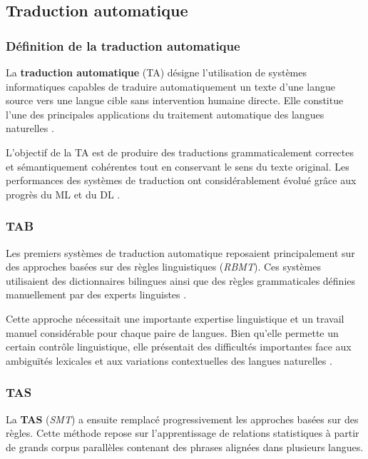 \subsection{Traduction automatique}

\subsubsection{Définition de la traduction automatique}

La \textbf{traduction automatique} (\ac{TA}) désigne l'utilisation de systèmes informatiques capables de traduire automatiquement un texte d'une langue source vers une langue cible sans intervention humaine directe. Elle constitue l'une des principales applications du traitement automatique des langues naturelles \cite{ranathunga2023neural}.

L'objectif de la \ac{TA} est de produire des traductions grammaticalement correctes et sémantiquement cohérentes tout en conservant le sens du texte original. Les performances des systèmes de traduction ont considérablement évolué grâce aux progrès du \ac{ML} et du \ac{DL} \cite{vaswani2017attention}.

\subsubsection{\ac{TAB}}

Les premiers systèmes de traduction automatique reposaient principalement sur des approches basées sur des règles linguistiques (\textit{\ac{RBMT}}). Ces systèmes utilisaient des dictionnaires bilingues ainsi que des règles grammaticales définies manuellement par des experts linguistes \cite{ranathunga2023neural}.

Cette approche nécessitait une importante expertise linguistique et un travail manuel considérable pour chaque paire de langues. Bien qu'elle permette un certain contrôle linguistique, elle présentait des difficultés importantes face aux ambiguïtés lexicales et aux variations contextuelles des langues naturelles \cite{dundjer2020automatic}.

\subsubsection{\ac{TAS}}

La \textbf{\ac{TAS}} (\textit{\ac{SMT}}) a ensuite remplacé progressivement les approches basées sur des règles. Cette méthode repose sur l'apprentissage de relations statistiques à partir de grands corpus parallèles contenant des phrases alignées dans plusieurs langues.

